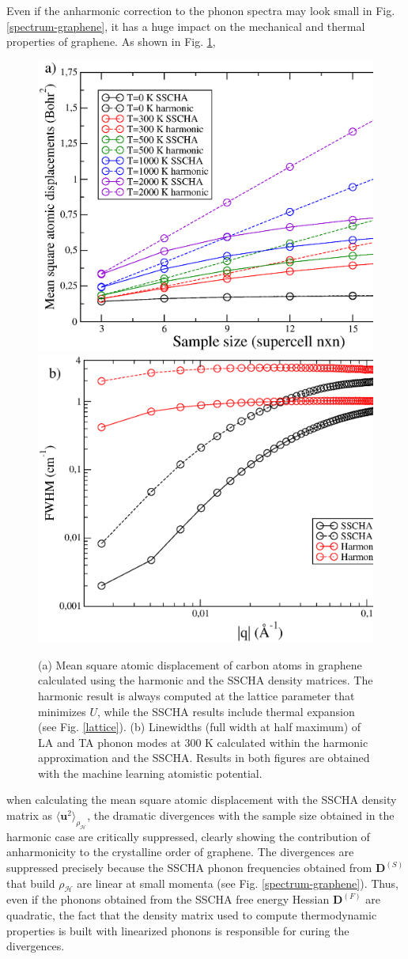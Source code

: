 Even if the anharmonic correction to the phonon spectra may look small in Fig. \ref{spectrum-graphene}, it has a 
huge impact on the mechanical and thermal properties of graphene. As shown in Fig. \ref{problems}, 
\begin{figure}[ht]
\includegraphics[width=0.49\linewidth]{Figures/rms.eps}
\includegraphics[width=0.49\linewidth]{Figures/lw-graphene.eps}
\caption[SSCHA mean square atomic displacements and linewidths]{(a) Mean square atomic displacement of carbon atoms 
	in graphene calculated using the harmonic and the SSCHA density matrices. The harmonic result is always 
	computed at the lattice parameter that minimizes $U$, while the SSCHA results include thermal expansion (see 
	Fig. \ref{lattice}). (b) Linewidths (full width at half maximum) of LA and TA phonon modes at $300$ K 
	calculated within the harmonic approximation and the SSCHA. Results in both figures are obtained with the 
	machine learning atomistic potential.}
\label{problems}
\end{figure}
when calculating the mean square atomic displacement with the SSCHA density matrix as 
$\langle \mathbf{u}^2 \rangle_{\rho_{\mathcal{H}}}$, the dramatic divergences with the sample size obtained in the 
harmonic case are critically suppressed, clearly showing the contribution of anharmonicity to the crystalline order 
of graphene. The divergences are suppressed precisely because the SSCHA phonon frequencies obtained from 
$\boldsymbol{D}^{(S)}$ that build $\rho_{\mathcal{H}}$ are linear at small momenta (see 
Fig. \ref{spectrum-graphene}). Thus, even if the phonons obtained from the SSCHA free energy Hessian 
$\boldsymbol{D}^{(F)}$ are quadratic, the fact that the density matrix used to compute thermodynamic properties is 
built with linearized phonons is responsible for curing the divergences. \\

